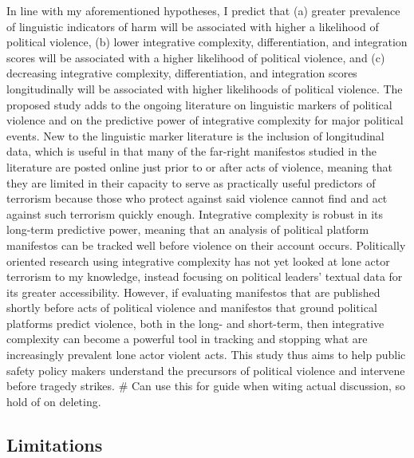 \documentclass[
  english,
  man]{apa6}
\begin{document}
In line with my aforementioned hypotheses, I predict that (a) greater prevalence of
linguistic indicators of harm will be associated with higher a likelihood of political
violence, (b) lower integrative complexity, differentiation, and integration scores will be
associated with a higher likelihood of political violence, and (c) decreasing integrative
complexity, differentiation, and integration scores longitudinally will be associated with
higher likelihoods of political violence. The proposed study adds to the ongoing literature
on linguistic markers of political violence and on the predictive power of integrative
complexity for major political events. New to the linguistic marker literature is the
inclusion of longitudinal data, which is useful in that many of the far-right manifestos
studied in the literature are posted online just prior to or after acts of violence, meaning
that they are limited in their capacity to serve as practically useful predictors of
terrorism because those who protect against said violence cannot find and act against such
terrorism quickly enough. Integrative complexity is robust in its long-term predictive
power, meaning that an analysis of political platform manifestos can be tracked well before
violence on their account occurs. Politically oriented research using integrative complexity
has not yet looked at lone actor terrorism to my knowledge, instead focusing on political
leaders' textual data for its greater accessibility. However, if evaluating manifestos that
are published shortly before acts of political violence and manifestos that ground political
platforms predict violence, both in the long- and short-term, then integrative complexity
can become a powerful tool in tracking and stopping what are increasingly prevalent lone
actor violent acts. This study thus aims to help public safety policy makers understand the
precursors of political violence and intervene before tragedy strikes.
\#\textbar{} Can use this for guide when witing actual discussion, so hold of on deleting.

\subsection{Limitations}\label{limitations}
\end{document}
